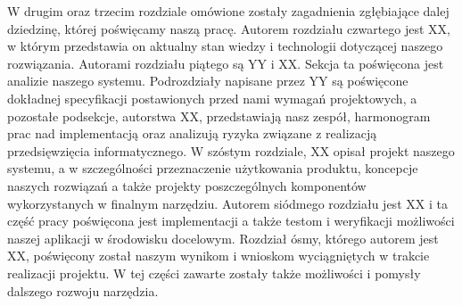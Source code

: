 W drugim oraz trzecim rozdziale omówione zostały zagadnienia zgłębiające dalej dziedzinę, której poświęcamy naszą pracę. Autorem rozdziału czwartego jest XX, w którym przedstawia on aktualny stan wiedzy i technologii dotyczącej naszego rozwiązania. Autorami rozdziału piątego są YY i XX. Sekcja ta poświęcona jest analizie naszego systemu. Podrozdziały napisane przez YY są poświęcone dokładnej specyfikacji postawionych przed nami wymagań projektowych, a pozostałe podsekcje, autorstwa XX, przedstawiają nasz zespół, harmonogram prac nad implementacją oraz analizują ryzyka związane z realizacją przedsięwzięcia informatycznego. W szóstym rozdziale, XX opisał projekt naszego systemu, a w szczególności przeznaczenie użytkowania produktu, koncepcje naszych rozwiązań a także projekty poszczególnych komponentów wykorzystanych w finalnym narzędziu. Autorem siódmego rozdziału jest XX i ta część pracy poświęcona jest implementacji a także testom i weryfikacji możliwości naszej aplikacji w środowisku docelowym. Rozdział ósmy, którego autorem jest XX, poświęcony został naszym wynikom i wnioskom wyciągniętych w trakcie realizacji projektu. W tej części zawarte zostały także możliwości i pomysły dalszego rozwoju narzędzia. 